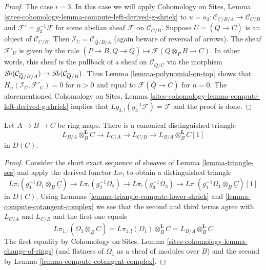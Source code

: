 \begin{proof}
\medskip\noindent
The case $i = 3$. In this case we will apply
Cohomology on Sites, Lemma
\ref{sites-cohomology-lemma-compute-left-derived-g-shriek}
to $u = u_3 : \mathcal{C}_{C/B/A} \to \mathcal{C}_{C/B}$
and $\mathcal{F}' = g_3^{-1}\mathcal{F}$ for some abelian sheaf
$\mathcal{F}$ on $\mathcal{C}_{C/B}$.
Suppose $U = (\overline{Q} \to C)$ is an object of $\mathcal{C}_{C/B}$.
Then $\mathcal{I}_U = \mathcal{C}_{\overline{Q}/B/A}$ (again beware
of reversal of arrows). The sheaf $\mathcal{F}'_U$ is given by the
rule $(P \to B, Q \to \overline{Q}) \mapsto \mathcal{F}(Q \otimes_P B \to C)$.
In other words, this sheaf is the pullback of a sheaf
on $\mathcal{C}_{\overline{Q}/C}$ via the morphism
$\mathop{\mathit{Sh}}\nolimits(\mathcal{C}_{\overline{Q}/B/A}) \to \mathop{\mathit{Sh}}\nolimits(\mathcal{C}_{\overline{Q}/B})$.
Thus Lemma \ref{lemma-polynomial-on-top} shows that
$H_n(\mathcal{I}_U, \mathcal{F}'_U) = 0$ for $n > 0$
and equal to $\mathcal{F}(\overline{Q} \to C)$ for $n = 0$.
The aforementioned Cohomology on Sites, Lemma
\ref{sites-cohomology-lemma-compute-left-derived-g-shriek}
implies that $Lg_{3, !}(g_3^{-1}\mathcal{F}) = \mathcal{F}$ and
the proof is done.
\end{proof}

\begin{proposition}
\label{proposition-triangle}
Let $A \to B \to C$ be ring maps. There is a canonical distinguished
triangle
$$
L_{B/A} \otimes_B^\mathbf{L} C \to L_{C/A} \to L_{C/B} \to
L_{B/A} \otimes_B^\mathbf{L} C[1]
$$
in $D(C)$.
\end{proposition}

\begin{proof}
Consider the short exact sequence of sheaves of
Lemma \ref{lemma-triangle-ses}
and apply the derived functor $L\pi_!$ to obtain a distinguished
triangle
$$
L\pi_!(g_1^{-1}\Omega_1 \otimes_{\underline{B}} \underline{C}) \to
L\pi_!(g_2^{-1}\Omega_2) \to
L\pi_!(g_3^{-1}\Omega_3) \to
L\pi_!(g_1^{-1}\Omega_1 \otimes_{\underline{B}} \underline{C})[1]
$$
in $D(C)$. Using Lemmas \ref{lemma-triangle-compute-lower-shriek} and
\ref{lemma-compute-cotangent-complex}
we see that the second and third terms agree with $L_{C/A}$ and $L_{C/B}$
and the first one equals
$$
L\pi_{1, !}(\Omega_1 \otimes_{\underline{B}} \underline{C}) =
L\pi_{1, !}(\Omega_1) \otimes_B^\mathbf{L} C =
L_{B/A} \otimes_B^\mathbf{L} C
$$
The first equality by Cohomology on Sites, Lemma
\ref{sites-cohomology-lemma-change-of-rings}
(and flatness of $\Omega_1$ as a sheaf of modules over $\underline{B}$)
and the second by Lemma \ref{lemma-compute-cotangent-complex}.
\end{proof}

